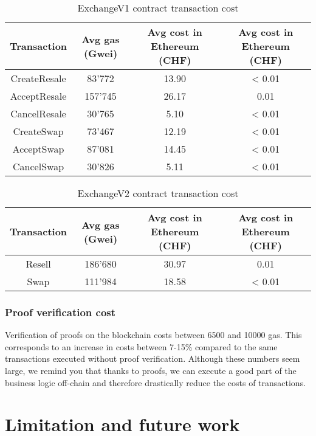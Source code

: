 \documentclass[a4paper,11pt,oneside]{report}
\begin{document}
\begin{table}[h!]
\begin{center}
\begin{NiceTabular}{ |c||c|c|c| }
 \hline
 Transaction & Avg gas (Gwei) & Avg cost in Ethereum (CHF) & Avg cost in Ethereum (CHF) \\
 \hline \hline
 CreateResale & 83'772 & 13.90 & < 0.01 \\
 AcceptResale & 157'745 & 26.17 & 0.01 \\
 CancelResale & 30'765 & 5.10 & < 0.01 \\
 CreateSwap & 73'467 & 12.19 & < 0.01 \\
 AcceptSwap & 87'081 & 14.45 & < 0.01 \\
 CancelSwap & 30'826 & 5.11 & < 0.01 \\
 \hline
\end{NiceTabular}
\caption{ExchangeV1 contract transaction cost}
\label{table:exchangeV1_contract_transaction_cost}
\end{center}
\end{table}

\begin{table}[h!]
\begin{center}
\begin{NiceTabular}{ |c||c|c|c| }
 \hline
 Transaction & Avg gas (Gwei) & Avg cost in Ethereum (CHF) & Avg cost in Ethereum (CHF) \\
 \hline \hline
 Resell & 186'680 & 30.97 & 0.01 \\
 Swap & 111'984 & 18.58 & < 0.01 \\
 \hline
\end{NiceTabular}
\caption{ExchangeV2 contract transaction cost}
\label{table:exchangeV2_contract_transaction_cost}
\end{center}
\end{table}

\subsection{Proof verification cost}
Verification of proofs on the blockchain costs between 6500 and 10000 gas. This corresponds to an increase in costs between 7-15\% compared to the same transactions executed without proof verification. Although these numbers seem large, we remind you that thanks to proofs, we can execute a good part of the business logic off-chain and therefore drastically reduce the costs of transactions.

\chapter{Limitation and future work}
\end{document}
